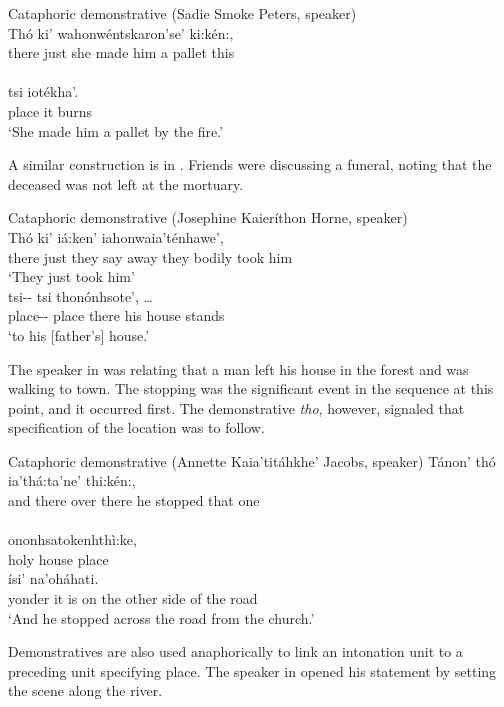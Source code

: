 \documentclass[output=paper,colorlinks,citecolor=brown]{langscibook}
\begin{document}
\ea \label{ex:mithun:8} Cataphoric demonstrative (Sadie Smoke Peters, speaker)\\
\gll Thó    ki' wahonwéntskaron'se'      ki:kén:,\\
     there  just  {she made him a pallet}  this  \\
\medskip\\
\gll tsi iotékha'.\\
place {it burns}\\
\glt `She made him a pallet by the fire.'
\z

A similar construction is in . Friends were discussing a funeral, noting that the deceased was not left at the mortuary.

\ea\label{ex:mithun:9}Cataphoric demonstrative (Josephine Kaieríthon Horne, speaker)\\
\gll Thó ki' iá:ken' iahonwaia'ténhawe',\\
there {just} {they say} {away they bodily took him}\\
\glt `They just took him'\medskip\\
\gll tsi-\/- tsi {thonónhsote',  \ldots }\\
     place-\/-  place {there his house stands}\\
\glt `to his {[}father's{]} house.'
\z

The speaker in  was relating that a man left his house in the forest and was walking to town. The stopping was the significant event in the sequence at this point, and it occurred first. The demonstrative \emph{tho}, however, signaled that specification of the location was to follow.


\ea \label{ex:mithun:10}Cataphoric demonstrative (Annette Kaia'titáhkhe' Jacobs, speaker)
\gll Tánon' thó ia'thá:ta'ne'             thi:kén:,\\ 
     and  there  {over there he stopped}  {that one}\\ 
\medskip\\
ononhsatokenhthì:ke,\\
holy house place\medskip\\
\gll ísi' na'oháhati.\\
yonder {it is on the other side of the road}\\
\glt `And he stopped across the road from the church.'
\z

Demonstratives are also used anaphorically to link an intonation unit to a preceding unit specifying place. The speaker in  opened his statement by setting the scene along the river.
\end{document}

